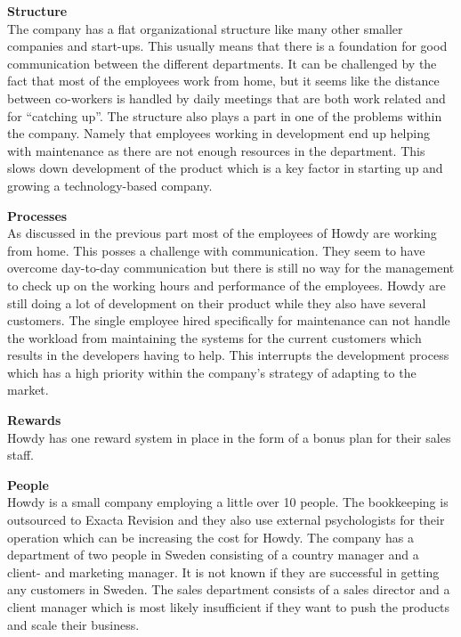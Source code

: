 \noindent \textbf{Structure}\\
\noindent The company has a flat organizational structure like many other smaller companies and start-ups. This usually means that there is a foundation for good communication between the different departments. It can be challenged by the fact that most of the employees work from home, but it seems like the distance between co-workers is handled by daily meetings that are both work related and for “catching up”. The structure also plays a part in one of the problems within the company. Namely that employees working in development end up helping with maintenance as there are not enough resources in the department. This slows down development of the product which is a key factor in starting up and growing a technology-based company.

\noindent \textbf{Processes}\\
\noindent As discussed in the previous part most of the employees of Howdy are working from home. This posses a challenge with communication. They seem to have overcome day-to-day communication but there is still no way for the management to check up on the working hours and performance of the employees.
Howdy are still doing a lot of development on their product while they also have several customers. The single employee hired specifically for maintenance can not handle the workload from maintaining the systems for the current customers which results in the developers having to help. This interrupts the development process which has a high priority within the company’s strategy of adapting to the market.

\noindent \textbf{Rewards}\\
\noindent Howdy has one reward system in place in the form of a bonus plan for their sales staff.

\noindent \textbf{People}\\
\noindent Howdy is a small company employing a little over 10 people. The bookkeeping is outsourced to Exacta Revision and they also use external psychologists for their operation which can be increasing the cost for Howdy.
The company has a department of two people in Sweden consisting of a country manager and a client- and marketing manager. It is not known if they are successful in getting any customers in Sweden.
The sales department consists of a sales director and a client manager which is most likely insufficient if they want to push the products and scale their business.


